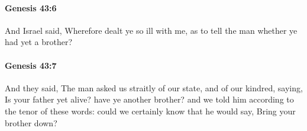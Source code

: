 		\paragraph{Genesis 43:6} %
			\label{GENESIS-43-6}

			And Israel said, Wherefore dealt ye so ill with me, as to tell the man whether ye had yet a brother?


		\paragraph{Genesis 43:7} %
			\label{GENESIS-43-7}

			And they said, The man asked us straitly of our state, and of our kindred, saying, Is your father yet alive? have ye another brother? and we told him according to the tenor of these words: could we certainly know that he would say, Bring your brother down?


